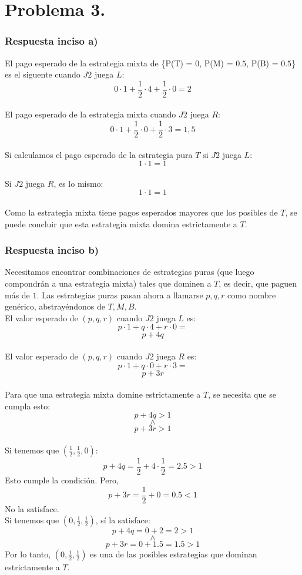 \documentclass{article}
\begin{document}
    \section*{Problema 3.}
        \subsubsection*{Respuesta inciso a)}
            El pago esperado de la estrategia mixta de \{P(T) = 0, P(M) = $0.5$, P(B) = $0.5$\} es el siguente cuando $J2$ juega $L$:        
            \[0 \cdot 1 + \frac{1}{2} \cdot 4 + \frac{1}{2} \cdot 0 = 2\]
            \\
            El pago esperado de la estrategia mixta cuando $J2$ juega $R$:
            \[0 \cdot 1 + \frac{1}{2} \cdot 0 + \frac{1}{2} \cdot 3 = 1,5\]
            \\
            Si calculamos el pago esperado de la estrategia pura $T$ si $J2$ juega $L$:
            \[ 1 \cdot 1 = 1\]
            \\
            Si $J2$ juega $R$, es lo mismo:
            \[1 \cdot 1 = 1\]
            \\
            Como la estrategia mixta tiene pagos esperados mayores que los posibles de $T$, se puede concluir que esta estrategia mixta domina estrictamente a $T$.

        \subsubsection*{Respuesta inciso b)}
            Necesitamos encontrar combinaciones de estrategias puras (que luego compondrán a una estrategia mixta) tales que dominen a $T$, es decir, que paguen más de $1$. Las estrategias puras pasan ahora a llamarse $p, q, r$ como nombre genérico, abstrayéndonos de $T, M, B$.
            \\
            El valor esperado de $(p, q, r)$ cuando $J2$ juega $L$ es:
            \[ p \cdot 1 + q \cdot 4 + r \cdot 0 = \]
            \[p+4q\]
            \\
            El valor esperado de $(p, q, r)$ cuando $J2$ juega $R$ es:
            \[p \cdot 1 + q \cdot 0 + r \cdot 3 =\]
            \[p+3r\]
            \\
            Para que una estrategia mixta domine estrictamente a $T$, se necesita que se cumpla esto:
            \[p + 4q > 1\]
            \[\wedge\]
            \[p+3r > 1\]
            \\
            Si tenemos que $(\frac{1}{2},\frac{1}{2},0)$:
            \[p+4q = \frac{1}{2}+4\cdot\frac{1}{2} = 2.5 > 1\]
            Esto cumple la condición. Pero,
            \[p+3r = \frac{1}{2}+0 = 0.5 < 1\]
            No la satisface.
            \\
            Si tenemos que $(0, \frac{1}{2}, \frac{1}{2})$, sí la satisface:
            \[p+4q = 0+2 = 2 > 1\]
            \[\wedge\]
            \[p+3r = 0 + 1.5 = 1.5 > 1\]
            Por lo tanto, $(0, \frac{1}{2}, \frac{1}{2})$ es una de las posibles estrategias que dominan estrictamente a $T$.
\end{document}
